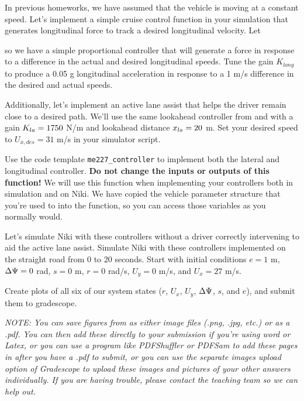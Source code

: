 
In previous homeworks, we have assumed that the vehicle is moving at a constant speed. Let's implement a simple cruise control function in your simulation that generates longitudinal force to track a desired longitudinal velocity. Let 

so we have a simple proportional controller that will generate a force in response to a difference in the actual and
desired longitudinal speeds. Tune the gain $K_{long}$ to produce a 0.05 g longitudinal acceleration in
response to a 1 \si{\m/\s} difference in the desired and actual speeds. 

Additionally, let's implement an active lane assist that helps the driver remain close to a desired path.  We'll use the same lookahead controller from  and
 with a gain $K_{la} = 1750$ \si{\N/\m} and lookahead distance $x_{la} =
20$ \si{\m}. Set your desired speed to $U_{x,des} = 31$ \si{\m/\s} in your simulator script.

Use the code template \verb!me227_controller! to implement both the lateral and longitudinal controller. \textbf{Do not
change the inputs or outputs of this function!} We will use this function when implementing your controllers both in
simulation and on Niki. We have copied the vehicle parameter structure that you're used to into the function, so you can
access those variables as you normally would.

Let's simulate Niki with these controllers without a driver correctly intervening to aid the active lane assist. Simulate Niki with these controllers implemented on the straight road from 0 to 20 seconds.
Start with initial conditions $e = 1$ m, $\Delta\Psi = 0$ rad, $s = 0$ m, $r = 0$ rad/s, $U_y = 0$ m/s, and $U_x = 27$ m/s.

Create plots of all six of our system states ($r$, $U_x$, $U_y$, $\Delta\Psi$, $s$, and $e$), and submit them to gradescope.

\textit{NOTE: You can save figures from \MOno{} as either image files (.png, .jpg, etc.) or as a .pdf. You can then add
    these directly to your submission if you're using word or Latex, or you can use a program like PDFShuffler or
    PDFSam to add these pages in after you have a .pdf to submit, or you can use the separate images upload option of Gradescope to upload these images and pictures of your
other answers individually. If you are having trouble, please contact the teaching team so we can help out.}

